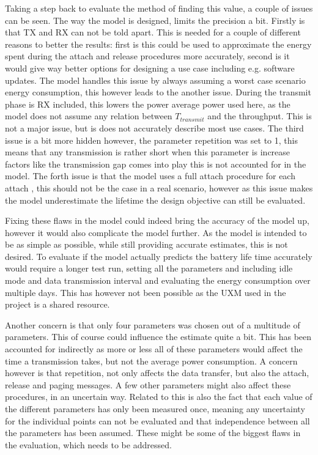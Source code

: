 Taking a step back to evaluate the method of finding this value, a couple of issues can be seen. The way the model is designed, limits the precision a bit. Firstly is that TX and RX can not be told apart. This is needed for a couple of different reasons to better the results: first is this could be used to approximate the energy spent during the attach and release procedures more accurately, second is it would give way better options for designing a use case including e.g. software updates. The model handles this issue by always assuming a worst case scenario energy consumption, this however leads to the another issue. During the transmit phase is RX included, this lowers the power average power used here, as the model does not assume any relation between $T_{transmit}$ and the throughput. This is not a major issue, but is does not accurately describe most use cases. The third issue is a bit more hidden however, the parameter repetition was set to 1, this means that any transmission is rather short when this parameter is increase factors like the transmission gap comes into play this is not accounted for in the model. The forth issue is that the model uses a full attach procedure for each attach , this should not be the case in a real scenario, however as this issue makes the model underestimate the lifetime the design objective can still be evaluated.

Fixing these flaws in the model could indeed bring the accuracy of the model up, however it would also complicate the model further. As the model is intended to be as simple as possible, while still providing accurate estimates, this is not desired. To evaluate if the model actually predicts the battery life time accurately would require a longer test run, setting all the parameters and including idle mode and data transmission interval and evaluating the energy consumption over multiple days. This has however not been possible as the UXM used in the project is a shared resource. 

Another concern is that only four parameters was chosen out of a multitude of parameters. This of course could influence the estimate quite a bit. This has been accounted for indirectly as more or less all of these parameters would affect the time a transmission takes, but not the average power consumption. A concern however is that repetition, not only affects the data transfer, but also the attach, release and paging messages. A few other parameters might also affect these procedures, in an uncertain way. Related to this is also the fact that each value of the different parameters has only been measured once, meaning any uncertainty for the individual points can not be evaluated and that independence between all the parameters has been assumed. These might be some of the biggest flaws in the evaluation, which needs to be addressed.

